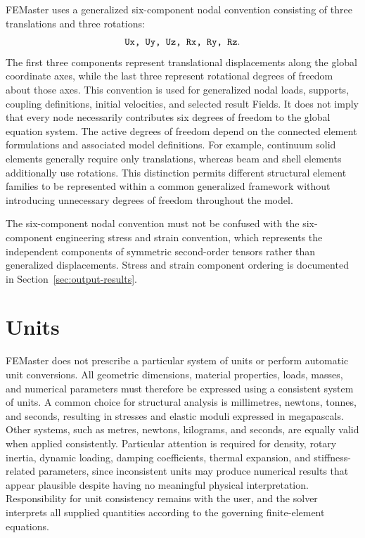 FEMaster uses a generalized six-component nodal convention consisting of three translations and three rotations:
\[
    \texttt{Ux, Uy, Uz, Rx, Ry, Rz}.
\]
The first three components represent translational displacements along the global coordinate axes, while the last three represent rotational degrees of freedom about those axes. This convention is used for generalized nodal loads, supports, coupling definitions, initial velocities, and selected result Fields. It does not imply that every node necessarily contributes six degrees of freedom to the global equation system. The active degrees of freedom depend on the connected element formulations and associated model definitions. For example, continuum solid elements generally require only translations, whereas beam and shell elements additionally use rotations. This distinction permits different structural element families to be represented within a common generalized framework without introducing unnecessary degrees of freedom throughout the model.

The six-component nodal convention must not be confused with the six-component engineering stress and strain convention, which represents the independent components of symmetric second-order tensors rather than generalized displacements. Stress and strain component ordering is documented in Section~\ref{sec:output-results}.


\section{Units}

FEMaster does not prescribe a particular system of units or perform automatic unit conversions. All geometric dimensions, material properties, loads, masses, and numerical parameters must therefore be expressed using a consistent system of units. A common choice for structural analysis is millimetres, newtons, tonnes, and seconds, resulting in stresses and elastic moduli expressed in megapascals. Other systems, such as metres, newtons, kilograms, and seconds, are equally valid when applied consistently. Particular attention is required for density, rotary inertia, dynamic loading, damping coefficients, thermal expansion, and stiffness-related parameters, since inconsistent units may produce numerical results that appear plausible despite having no meaningful physical interpretation. Responsibility for unit consistency remains with the user, and the solver interprets all supplied quantities according to the governing finite-element equations.


